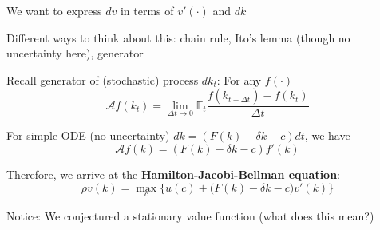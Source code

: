 \documentclass[11pt, aspectratio=169]{beamer}
\newenvironment{witemize}{\itemize\addtolength{\itemsep}{10pt}}{\enditemize}
\begin{document}
\begin{frame}{}
\begin{witemize}
\item We want to express $dv$ in terms of $v'(\cdot)$ and $dk$

\item Different ways to think about this: chain rule, Ito's lemma (though no uncertainty here), generator

\item Recall generator of (stochastic) process $dk_t$: For any $f(\cdot)$
\begin{equation*}
	\mathcal A f(k_t) = \lim_{\Delta t \to 0} \mathbb{E}_t \frac{ f(k_{t + \Delta t}) - f(k_t) }{\Delta t}
\end{equation*}

\item For simple ODE (no uncertainty) $dk = (F(k) - \delta k - c) dt$, we have
\begin{equation*}
	\mathcal A f(k) = (F(k) - \delta k - c) f'(k)
\end{equation*}

\item Therefore, we arrive at the \textbf{Hamilton-Jacobi-Bellman equation}:
\begin{equation*}
	\rho v(k) = \max_c \Big\{ u(c) + \Big( F(k) - \delta k - c \Big) v'(k) \Big\}
\end{equation*}

\item Notice: We conjectured a stationary value function (what does this mean?)
\end{witemize}
\end{frame}
\end{document}
